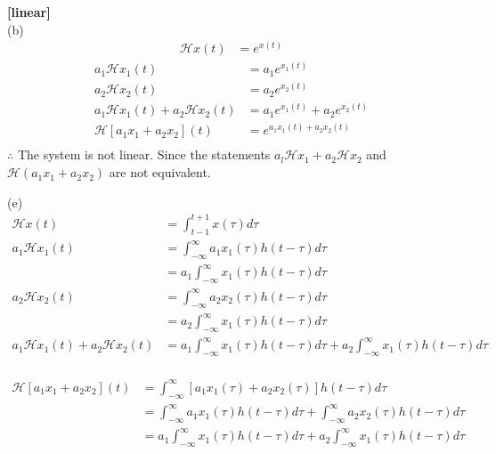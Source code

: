 \documentclass{article}
\begin{document}
 {\bf [linear]}\\
(b)
\begin{equation*}
\begin{split}
    \mathcal{H}x(t) &= e^{x(t)}
\end{split}
\end{equation*}
\begin{equation*}
\begin{split}
    a_1 \mathcal{H} x_1 (t) &= a_1e^{x_1(t)}\\
    a_2 \mathcal{H} x_2 (t) &= a_2e^{x_2(t)}\\
    a_1 \mathcal{H} x_1 (t) + a_2 \mathcal{H} x_2 (t) &= a_1e^{x_1(t)} + a_2e^{x_2(t)}\\
    \mathcal{H}[a_1x_1 + a_2x_2](t) &= e^{a_1x_1(t) + a_2x_2(t)}\\
\end{split}
\end{equation*}
$\therefore$ The system is not linear. Since the statements $a_l\mathcal{H}x_1 + a_2\mathcal{H}x_2$ and $\mathcal{H}(a_1x_1 + a_2x_2)$ are not equivalent.

(e)
\begin{equation*}
\begin{split}
    \mathcal{H}x(t) &= \int_{t - 1}^{t + 1} x (\tau) d \tau\\
    a_1 \mathcal{H}x_1(t) &= \int_{-\infty}^{\infty} a_1x_1(\tau) h (t - \tau) d\tau\\
    &= a_1 \int_{-\infty}^{\infty} x_1(\tau) h (t - \tau) d\tau\\
    a_2 \mathcal{H}x_2(t) &= \int_{-\infty}^{\infty} a_2x_2(\tau) h (t - \tau) d\tau\\
    &= a_2 \int_{-\infty}^{\infty} x_1(\tau) h (t - \tau) d\tau\\
    a_1 \mathcal{H}x_1(t) + a_2 \mathcal{H}x_2(t) &= a_1 \int_{-\infty}^{\infty} x_1(\tau) h (t - \tau) d\tau + a_2 \int_{-\infty}^{\infty} x_1(\tau) h (t - \tau) d\tau\\
\end{split}
\end{equation*}

\begin{equation*}
\begin{split}
    \mathcal{H}[a_1x_1 + a_2x_2](t) &= \int_{-\infty}^{\infty} [a_1x_1(\tau) + a_2x_2(\tau)] h(t - \tau)d\tau\\
    &= \int_{-\infty}^{\infty} a_1x_1(\tau) h (t - \tau) d\tau + \int_{-\infty}^{\infty} a_2x_2(\tau) h (t - \tau) d\tau\\
    &= a_1 \int_{-\infty}^{\infty} x_1(\tau) h (t - \tau) d\tau + a_2 \int_{-\infty}^{\infty} x_1(\tau) h (t - \tau) d\tau\\
\end{split}
\end{equation*}
\end{document}
